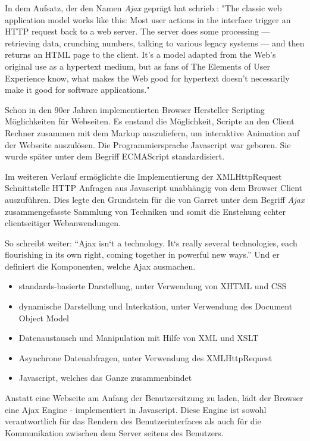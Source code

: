 In dem Aufsatz, der den Namen \emph{Ajax} geprägt hat schrieb \cite{Garrett:2005}: "The classic web application model works like this: Most user actions in the interface trigger an HTTP request back to a web server. The server does some processing — retrieving data, crunching numbers, talking to various legacy systems — and then returns an HTML page to the client. It’s a model adapted from the Web’s original use as a hypertext medium, but as fans of The Elements of User Experience know, what makes the Web good for hypertext doesn’t necessarily make it good for software applications."

Schon in den 90er Jahren implementierten Browser Hersteller Scripting Möglichkeiten für Webseiten. Es enstand die Möglichkeit, Scripte an den Client Rechner zusammen mit dem Markup auszuliefern, um interaktive Animation auf der Webseite auszulösen. Die Programmiersprache Javascript war geboren. Sie wurde später unter dem Begriff ECMAScript standardisiert.

Im weiteren Verlauf ermöglichte die Implementierung der XMLHttpRequest Schnittstelle HTTP Anfragen aus Javascript unabhängig von dem Browser Client auszuführen. Dies legte den Grundstein für die von Garret unter dem Begriff \emph{Ajax} zusammengefasste Sammlung von Techniken und somit die Enstehung echter clientseitiger Webanwendungen.

So schreibt \cite{Garrett:2005} weiter: \enquote{Ajax isn`t a technology. It`s really several technologies, each flourishing in its own right, coming together in powerful new ways.} Und er definiert die Komponenten, welche Ajax ausmachen.

\begin{itemize} 
\item standards-basierte Darstellung, unter Verwendung von XHTML und CSS 
\item dynamische Darstellung und Interkation, unter Verwendung des Document Object Model
\item Datenaustausch und Manipulation mit Hilfe von XML und XSLT
\item Asynchrone Datenabfragen, unter Verwendung des XMLHttpRequest
\item Javascript, welches das Ganze zusammenbindet
\end{itemize}

Anstatt eine Webseite am Anfang der Benutzersitzung zu laden, lädt der Browser eine Ajax Engine - implementiert in Javascript. Diese Engine ist sowohl verantwortlich für das Rendern des Benutzerinterfaces als auch für die Kommunikation zwischen dem Server seitens des Benutzers. 


